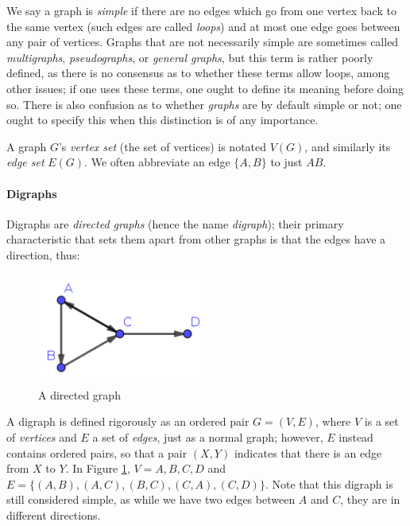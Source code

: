\documentclass{article}
\begin{document}
	We say a graph is \textit{simple} if there are no edges which go from one vertex back to the same vertex (such edges are called \textit{loops}) and at most one edge goes between any pair of vertices. Graphs that are not necessarily simple are sometimes called \textit{multigraphs}, \textit{pseudographs}, or \textit{general graphs}, but this term is rather poorly defined, as there is no consensus as to whether these terms allow loops, among other issues; if one uses these terms, one ought to define its meaning before doing so. There is also confusion as to whether \textit{graphs} are by default simple or not; one ought to specify this when this distinction is of any importance.
	
	A graph \(G\)'s \textit{vertex set} (the set of vertices) is notated \(V(G)\), and similarly its \textit{edge set} \(E(G)\). We often abbreviate an edge \(\{A,B\}\) to just \(AB\).
	
	\paragraph{Digraphs}
	
	Digraphs are \textit{directed graphs} (hence the name \textit{digraph}); their primary characteristic that sets them apart from other graphs is that the edges have a direction, thus:
	
	\begin{figure}[h]
		\centering
		\includegraphics[width=0.5\textwidth]{directedgraph}
		\caption{A directed graph}
		\label{directedgraph}
	\end{figure}
	
	A digraph is defined rigorously as an ordered pair \(G=(V,E)\), where \(V\) is a set of \textit{vertices} and \(E\) a set of \textit{edges}, just as a normal graph; however, \(E\) instead contains ordered pairs, so that a pair \((X,Y)\) indicates that there is an edge from \(X\) to \(Y\). In Figure \ref{directedgraph}, \(V={A,B,C,D}\) and \(E=\{(A,B),(A,C),(B,C),(C,A),(C,D)\}\). Note that this digraph is still considered simple, as while we have two edges between \(A\) and \(C\), they are in different directions.
	
\end{document}

